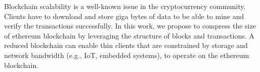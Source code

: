 Blockchain scalability is a well-known issue in the cryptocurrency community.
Clients have to download and store giga bytes of data to be able to mine and verify the transactions successfully.
In this work, we propose to compress the size of ethereum blockchain by leveraging the structure of blocks and transactions.
A reduced blockchain can enable thin clients  that are constrained by storage and network bandwidth (e.g., IoT, embedded systems),
 to operate on the ethereum blockchain.

